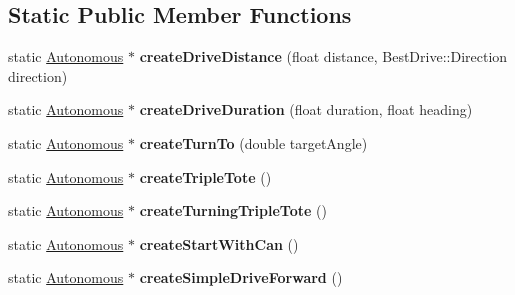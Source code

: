 \subsection*{Static Public Member Functions}
\begin{DoxyCompactItemize}
\item 
\hypertarget{class_autonomous_a6391f5e216f820029437e351bb84ae7c}{}static \hyperlink{class_autonomous}{Autonomous} $\ast$ {\bfseries create\+Drive\+Distance} (float distance, Best\+Drive\+::\+Direction direction)\label{class_autonomous_a6391f5e216f820029437e351bb84ae7c}

\item 
\hypertarget{class_autonomous_a500383605a081ceed65af68d7be3345d}{}static \hyperlink{class_autonomous}{Autonomous} $\ast$ {\bfseries create\+Drive\+Duration} (float duration, float heading)\label{class_autonomous_a500383605a081ceed65af68d7be3345d}

\item 
\hypertarget{class_autonomous_a43817961cc483af7d727a19dbb997484}{}static \hyperlink{class_autonomous}{Autonomous} $\ast$ {\bfseries create\+Turn\+To} (double target\+Angle)\label{class_autonomous_a43817961cc483af7d727a19dbb997484}

\item 
\hypertarget{class_autonomous_a5d1c89c581c7bb894a8d89df1e1d3ba4}{}static \hyperlink{class_autonomous}{Autonomous} $\ast$ {\bfseries create\+Triple\+Tote} ()\label{class_autonomous_a5d1c89c581c7bb894a8d89df1e1d3ba4}

\item 
\hypertarget{class_autonomous_af17ae791956f3bc069cdf89f197ecfc0}{}static \hyperlink{class_autonomous}{Autonomous} $\ast$ {\bfseries create\+Turning\+Triple\+Tote} ()\label{class_autonomous_af17ae791956f3bc069cdf89f197ecfc0}

\item 
\hypertarget{class_autonomous_ac8b0ffd5e3720924016111dc78491152}{}static \hyperlink{class_autonomous}{Autonomous} $\ast$ {\bfseries create\+Start\+With\+Can} ()\label{class_autonomous_ac8b0ffd5e3720924016111dc78491152}

\item 
\hypertarget{class_autonomous_a881241af00a09552049999e698948091}{}static \hyperlink{class_autonomous}{Autonomous} $\ast$ {\bfseries create\+Simple\+Drive\+Forward} ()\label{class_autonomous_a881241af00a09552049999e698948091}

\end{DoxyCompactItemize}


